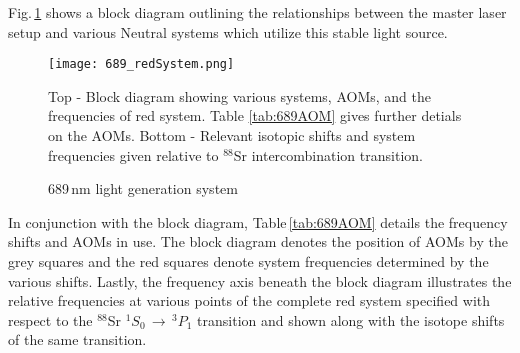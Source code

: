 Fig.\,\ref{fig:689blockSys} shows a block diagram outlining the relationships between the master laser setup and various Neutral systems which utilize this stable light source.
	\begin{figure}
		\centerline{
		\texttt{[image: 689\_redSystem.png]}}
		\caption{689\,nm light generation system}{Top - Block diagram showing various systems, AOMs, and the frequencies of red system. Table \ref{tab:689AOM} gives further detials on the AOMs. Bottom - Relevant isotopic shifts and system frequencies given relative to $^{88}$Sr intercombination transition.}
		\label{fig:689blockSys}
	\end{figure} 
In conjunction with the block diagram, Table\,\ref{tab:689AOM} details the frequency shifts and AOMs in use. 
The block diagram denotes the position of AOMs by the grey squares and the red squares denote system frequencies determined by the various shifts.
Lastly, the frequency axis beneath the block diagram illustrates the relative frequencies at various points of the complete red system specified with respect to the $^{88}$Sr $^1S_0\,\rightarrow\,^3P_1$ transition and shown along with the isotope shifts of the same transition.
